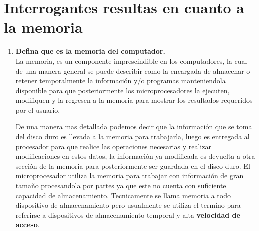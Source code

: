 \documentclass{article}
\begin{document}
\section{Interrogantes resultas en cuanto a la memoria} \label{contenido}

\begin{enumerate}
    \item \textbf{Defina que es la memoria del computador.}\\
    La memoria, es un componente imprescindible en los computadores, la cual de una manera general se puede describir como la encargada de almacenar o retener temporalmente la información y/o programas manteniendola disponible para que posteriormente los microprocesadores la ejecuten, modifiquen y la regresen a la memoria para mostrar los resultados requeridos por el usuario. \cite{augusto} \cite{ecured}
    
    De una manera mas detallada podemos decir que la información que se toma del disco duro es llevada a la memoria para trabajarla, luego es entregada al procesador para que realice las operaciones necesarias y realizar modificaciones en estos datos, la información ya modificada es devuelta a otra sección de la memoria para posteriormente ser guardada en el disco duro.
    El microprocesador utiliza la memoria para trabajar con información de gran tamaño procesandola por partes ya que este no cuenta con suficiente capacidad de almacenamiento.
    Tecnicamente se llama memoria a todo dispositivo de almacenamiento pero usualmente se utiliza el termino para referirse a dispositivos de almacenamiento temporal y alta \textbf{velocidad de acceso}. \cite{augusto}
    

\end{enumerate}
\end{document}
